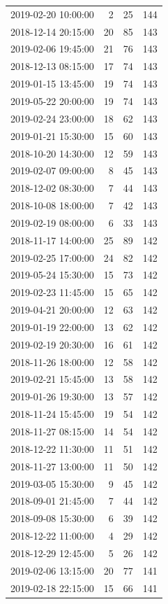 \begin{tabular}{lrrr}
2019-02-20 10:00:00 & 2 & 25 & 144 \\
2018-12-14 20:15:00 & 20 & 85 & 143 \\
2019-02-06 19:45:00 & 21 & 76 & 143 \\
2018-12-13 08:15:00 & 17 & 74 & 143 \\
2019-01-15 13:45:00 & 19 & 74 & 143 \\
2019-05-22 20:00:00 & 19 & 74 & 143 \\
2019-02-24 23:00:00 & 18 & 62 & 143 \\
2019-01-21 15:30:00 & 15 & 60 & 143 \\
2018-10-20 14:30:00 & 12 & 59 & 143 \\
2019-02-07 09:00:00 & 8 & 45 & 143 \\
2018-12-02 08:30:00 & 7 & 44 & 143 \\
2018-10-08 18:00:00 & 7 & 42 & 143 \\
2019-02-19 08:00:00 & 6 & 33 & 143 \\
2018-11-17 14:00:00 & 25 & 89 & 142 \\
2019-02-25 17:00:00 & 24 & 82 & 142 \\
2019-05-24 15:30:00 & 15 & 73 & 142 \\
2019-02-23 11:45:00 & 15 & 65 & 142 \\
2019-04-21 20:00:00 & 12 & 63 & 142 \\
2019-01-19 22:00:00 & 13 & 62 & 142 \\
2019-02-19 20:30:00 & 16 & 61 & 142 \\
2018-11-26 18:00:00 & 12 & 58 & 142 \\
2019-02-21 15:45:00 & 13 & 58 & 142 \\
2019-01-26 19:30:00 & 13 & 57 & 142 \\
2018-11-24 15:45:00 & 19 & 54 & 142 \\
2018-11-27 08:15:00 & 14 & 54 & 142 \\
2018-12-22 11:30:00 & 11 & 51 & 142 \\
2018-11-27 13:00:00 & 11 & 50 & 142 \\
2019-03-05 15:30:00 & 9 & 45 & 142 \\
2018-09-01 21:45:00 & 7 & 44 & 142 \\
2018-09-08 15:30:00 & 6 & 39 & 142 \\
2018-12-22 11:00:00 & 4 & 29 & 142 \\
2018-12-29 12:45:00 & 5 & 26 & 142 \\
2019-02-06 13:15:00 & 20 & 77 & 141 \\
2019-02-18 22:15:00 & 15 & 66 & 141 \\

\end{tabular}
